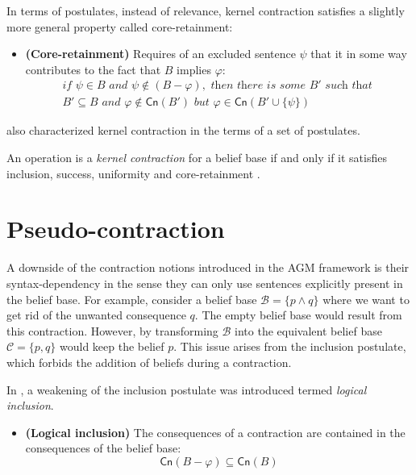 In terms of postulates, instead of relevance, kernel contraction satisfies a slightly more general property called core-retainment:
\begin{itemize}
    \item[] \textbf{(Core-retainment)} Requires of an excluded sentence $\psi$ that it in some way contributes to the fact that $B$ implies $\varphi$:
    \begin{equation*}
        \begin{split}
            \textit{if } \psi \in B \textit{ and } \psi \notin (B - \varphi), \textit{ then there is some } B' \textit{ such that } \\
            B' \subseteq B \textit{ and } \varphi \notin \textsf{Cn}(B') \textit{ but } \varphi \in \textsf{Cn}(B' \cup \{ \psi \}) 
        \end{split}
    \end{equation*}
\end{itemize}

\citeauthor{Hansson1994} also characterized kernel contraction in the terms of a set of postulates.

\begin{theorem}
    An operation is a \textit{kernel contraction} for a belief base if and only if it satisfies inclusion, success, uniformity and core-retainment \citep{Hansson1994}.
\end{theorem}

\section{Pseudo-contraction}
\label{sec:pseudo-contraction}

A downside of the contraction notions introduced in the AGM framework \citep{AGM1985} is their syntax-dependency in the sense they can only use sentences explicitly present in the belief base. For example, consider a belief base $\mathcal{B} = \{ p \wedge q \}$ where we want to get rid of the unwanted consequence $q$. The empty belief base would result from this contraction. However, by transforming $\mathcal{B}$ into the equivalent belief base $\mathcal{C} = \{ p, q \}$ would keep the belief $p$. This issue arises from the inclusion postulate, which forbids the addition of beliefs during a contraction. 

In \citet{Hansson1989}, a weakening of the inclusion postulate was introduced termed \textit{logical inclusion}.

\begin{itemize}
    \item[] \textbf{(Logical inclusion)} The consequences of a contraction are contained in the consequences of the belief base:
    $$\textsf{Cn}(B - \varphi) \subseteq \textsf{Cn}(B)$$
\end{itemize}

